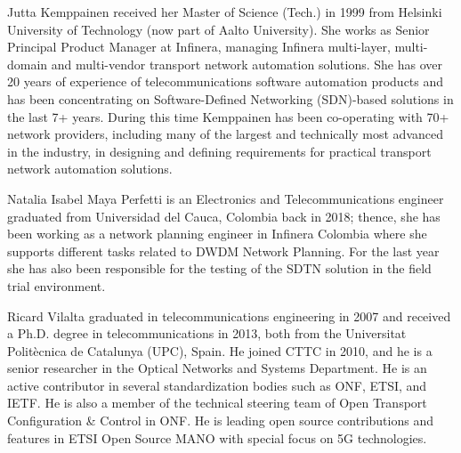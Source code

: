 \documentclass[10pt, conference]{IEEEtran}
\begin{document}
\begin{IEEEbiography}%
{Jutta Kemppainen} received her Master of Science (Tech.) in 1999 from Helsinki University of Technology (now part of Aalto University). She works as Senior Principal Product Manager at Infinera, managing Infinera multi-layer, multi-domain and multi-vendor transport network automation solutions. She has over 20 years of experience of telecommunications software automation products and has been concentrating on Software-Defined Networking (SDN)-based solutions in the last 7+ years. During this time Kemppainen has been co-operating with 70+ network providers, including many of the largest and technically most advanced in the industry, in designing and defining requirements for practical transport network automation solutions.\end{IEEEbiography}

\begin{IEEEbiography}%
{Natalia Isabel Maya Perfetti} is an Electronics and Telecommunications engineer graduated from Universidad del Cauca, Colombia back in 2018; thence, she has been working as a network planning engineer in Infinera Colombia where she supports different tasks related to DWDM Network Planning. For the last year she has also been responsible for the testing of the SDTN solution in the field trial environment.\end{IEEEbiography}

\begin{IEEEbiography}%
{Ricard Vilalta} graduated in telecommunications engineering in 2007 and received a Ph.D. degree in telecommunications in 2013, both from the Universitat Politècnica de Catalunya (UPC), Spain. He joined CTTC in 2010, and he is a senior researcher in the Optical Networks and Systems Department. He is an active contributor in several standardization bodies such as ONF, ETSI, and IETF. He is also a member of the technical steering team of Open Transport Configuration \& Control in ONF. He is leading open source contributions and features in ETSI Open Source MANO with special focus on 5G technologies.\end{IEEEbiography}
\end{document}
